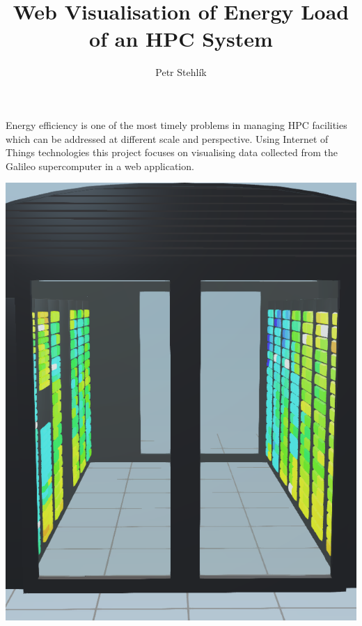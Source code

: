 \documentclass[a4paper, twoside]{article}
\title{Web Visualisation of Energy Load of an HPC System} %
\author{Petr Stehl\'ik} %
\newcommand{\includegraphicsvg}[2][]{%
  \ifnum\pdfstrcmp{\pdffilemoddate{./#2.svg}}%
  {\pdffilemoddate{../gen/#2.pdf}}>0%
  {\immediate\write18{inkscape -z -D --file=./#2.svg %
      --export-pdf=#2.pdf --export-eps=#2.eps %
      --export-area-drawing}}\fi%
  \texttt{[image: \#2]}%
}
\begin{document}
\noindent
\begin{minipage}{0.55\linewidth}
  \maketitle
  \fontsize{14pt}{20pt}\selectfont
  \raggedright
  Energy efficiency is one of the most timely problems in managing HPC facilities which can be addressed at different scale and perspective. Using Internet of Things technologies this project focuses on visualising data collected from the Galileo supercomputer in a web application. 
\end{minipage}\hfill
\begin{minipage}{0.40\textwidth}
  \includegraphics[width=\linewidth]{3d-model}
  \thispagestyle{empty}
\end{minipage}
\vskip 30pt
\frenchspacing
\end{document}
